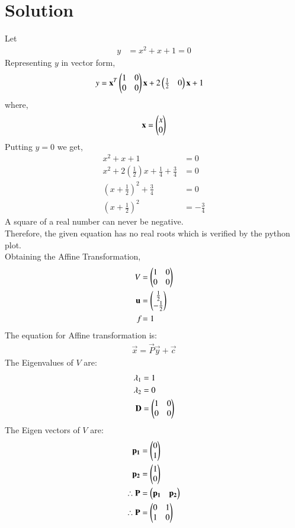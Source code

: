 \documentclass[journal,12pt,twocolumn]{IEEEtran}
\begin{document}
\section{Solution}
Let
\begin{align}
    y &= x^2 + x + 1 = 0
\end{align}
Representing $y$ in vector form,
\begin{align}
    y &= \mathbf{x}^T\begin{pmatrix}1 & 0\\0 & 0\end{pmatrix}\mathbf{x} + 2\begin{pmatrix}\frac{1}{2} & 0\end{pmatrix}\mathbf{x} + 1
\end{align}
where,
\begin{align}
    \mathbf{x} = \begin{pmatrix}x\\0\end{pmatrix}
\end{align}
Putting $y = 0$ we get,
\begin{align}
    x^2 + x + 1 &= 0\\
    x^2 + 2\left(\frac{1}{2}\right)x + \frac{1}{4} + \frac{3}{4} &= 0\\
    \left(x + \frac{1}{2}\right)^2 + \frac{3}{4} &= 0\\
    \left(x + \frac{1}{2}\right)^2 &= -\frac{3}{4}
\end{align}
A square of a real number can never be negative. \\
Therefore, the given equation has no real roots which is verified by the python plot.\\
Obtaining the Affine Transformation,
\begin{align}
    V &= \begin{pmatrix}1 & 0\\ 0 & 0\end{pmatrix}\\
    \mathbf{u} &= \begin{pmatrix}\frac{1}{2} \\ -\frac{1}{2}\end{pmatrix}\\
    \textit{f} &= 1 
\end{align}
The equation for Affine transformation is:
\begin{align}
    \vec{x} = \vec{P}\vec{y} + \vec{c}
\end{align}
The Eigenvalues of $V$ are:
\begin{align}
    \lambda_1 &= 1\\
    \lambda_2 &= 0\\
    \mathbf{D} &= \begin{pmatrix}1 & 0\\ 0 & 0\end{pmatrix}
\end{align}
The Eigen vectors of $V$ are:
\begin{align}
    \mathbf{p_1} &= \begin{pmatrix}0 \\ 1\end{pmatrix}\\
    \mathbf{p_2} &= \begin{pmatrix}1 \\ 0\end{pmatrix}\\
    \therefore \mathbf{P} &= \begin{pmatrix}\mathbf{p_1} & \mathbf{p_2}\end{pmatrix}\\
    \therefore \mathbf{P} &= \begin{pmatrix}0 & 1\\1 & 0\end{pmatrix}
\end{align}
\end{document}
